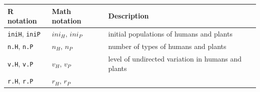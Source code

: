\documentclass[]{book}
\begin{document}
\begin{longtable}[]{@{}lll@{}}
\toprule
\begin{minipage}[b]{0.27\columnwidth}\raggedright
R notation\strut
\end{minipage} & \begin{minipage}[b]{0.25\columnwidth}\raggedright
Math notation\strut
\end{minipage} & \begin{minipage}[b]{0.40\columnwidth}\raggedright
Description\strut
\end{minipage}\tabularnewline
\midrule
\endhead
\begin{minipage}[t]{0.27\columnwidth}\raggedright
\texttt{iniH}, \texttt{iniP}\strut
\end{minipage} & \begin{minipage}[t]{0.25\columnwidth}\raggedright
\(ini_{H},\,ini_{P}\)\strut
\end{minipage} & \begin{minipage}[t]{0.40\columnwidth}\raggedright
initial populations of humans and plants\strut
\end{minipage}\tabularnewline
\begin{minipage}[t]{0.27\columnwidth}\raggedright
\texttt{n.H}, \texttt{n.P}\strut
\end{minipage} & \begin{minipage}[t]{0.25\columnwidth}\raggedright
\(n_{H},\,n_{P}\)\strut
\end{minipage} & \begin{minipage}[t]{0.40\columnwidth}\raggedright
number of types of humans and plants\strut
\end{minipage}\tabularnewline
\begin{minipage}[t]{0.27\columnwidth}\raggedright
\texttt{v.H}, \texttt{v.P}\strut
\end{minipage} & \begin{minipage}[t]{0.25\columnwidth}\raggedright
\(v_{H},\,v_{P}\)\strut
\end{minipage} & \begin{minipage}[t]{0.40\columnwidth}\raggedright
level of undirected variation in humans and plants\strut
\end{minipage}\tabularnewline
\begin{minipage}[t]{0.27\columnwidth}\raggedright
\texttt{r.H}, \texttt{r.P}\strut
\end{minipage} & \begin{minipage}[t]{0.25\columnwidth}\raggedright
\(r_{H},\,r_{P}\)\strut
\end{minipage} & \begin{minipage}[t]{0.40\columnwidth}\raggedright

\end{minipage}
\end{longtable}
\end{document}
